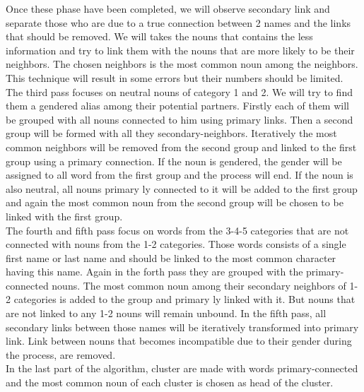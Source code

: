 \documentclass[a4paper, 12pt]{report}
\begin{document}
Once these phase have been completed, we will observe secondary link and separate those who are due to a true connection between 2 names and the links that should be removed.  We will takes the nouns that contains the less information and try to link them with the nouns that are more likely to be their neighbors. The chosen neighbors is the most common noun among the neighbors. This technique will result in some errors but their numbers should be limited.
\\
The third pass focuses on neutral nouns of category 1 and 2. We will try to find them a gendered alias among their potential partners. Firstly each of them will be grouped with all nouns connected to him using  primary links. Then a second group will be formed with all they secondary-neighbors. Iteratively the most common neighbors  will be removed from the second group and linked to the first group using a  primary  connection. If the noun is gendered, the gender will be assigned to all word from the first group and the process will end. If the noun is also neutral, all nouns  primary ly connected to it will be added to the first group and again the most common noun from the second group will be chosen to be linked with the first group. 
\\
The fourth and fifth pass focus on words from the 3-4-5 categories that are not connected with nouns from the 1-2 categories. Those words consists of a single first name or last name and should be linked to the most common character having this name. Again in the forth pass they are grouped with the primary-connected nouns. The most common noun among their secondary neighbors of 1-2 categories is added to the group and  primary ly linked with it. But nouns that are not linked to any 1-2 nouns will remain unbound. In the fifth pass, all secondary links between those names will be iteratively transformed into primary link. Link between nouns that becomes incompatible due to their gender during the process, are removed.
\\
In the last part of the algorithm, cluster are made with words primary-connected and the most common noun of each cluster is chosen as  head of the cluster.
\end{document}
